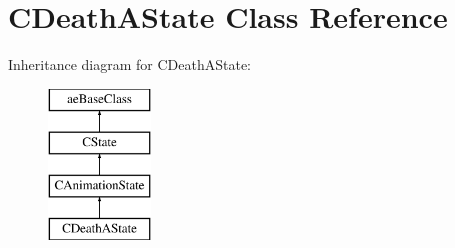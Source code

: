 \hypertarget{class_c_death_a_state}{}\section{C\+Death\+A\+State Class Reference}
\label{class_c_death_a_state}
Inheritance diagram for C\+Death\+A\+State\+:\begin{figure}[H]
\begin{center}
\leavevmode
\includegraphics[height=4.000000cm]{class_c_death_a_state}
\end{center}
\end{figure}
